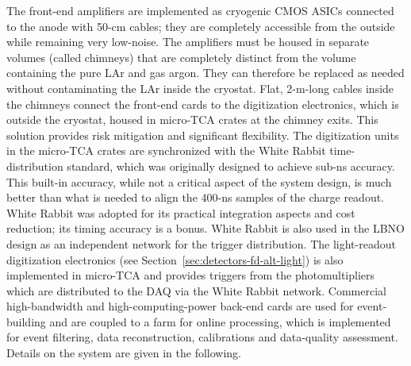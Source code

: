 The front-end amplifiers are implemented as cryogenic CMOS
ASICs connected to the anode with 50-cm cables; they are completely
accessible from the outside while remaining very low-noise.
The amplifiers must be housed in separate volumes (called chimneys) that are 
completely distinct from the volume containing the pure LAr and gas argon. They 
can therefore be replaced as needed without contaminating the LAr inside the 
cryostat. 
%
Flat, 2-m-long cables
inside the chimneys connect the front-end cards to the
digitization electronics, which is outside the cryostat, housed in
micro-TCA crates at the chimney exits. This solution %
provides risk mitigation and significant flexibility. The digitization
units in the micro-TCA crates are synchronized with the White Rabbit
time-distribution standard,  which was originally designed to
achieve sub-ns accuracy. 
%
This built-in accuracy, while not a critical aspect of the system
design, is much better than what is needed to align the 400-ns samples of
the charge readout. 
White Rabbit was adopted for its practical integration
aspects and cost reduction; its timing accuracy is a bonus.
White Rabbit is also used in the LBNO design as an independent network for
the trigger distribution. The light-readout digitization electronics (see Section~\ref{sec:detectors-fd-alt-light})
is also implemented in micro-TCA and provides triggers from the
photomultipliers which are distributed to the DAQ via the White Rabbit
network. Commercial high-bandwidth and high-computing-power back-end
cards are used for event-building and are coupled to a farm for online
processing, which is implemented for event filtering, data
reconstruction, calibrations and data-quality assessment. Details on
the system are given in the following. 


